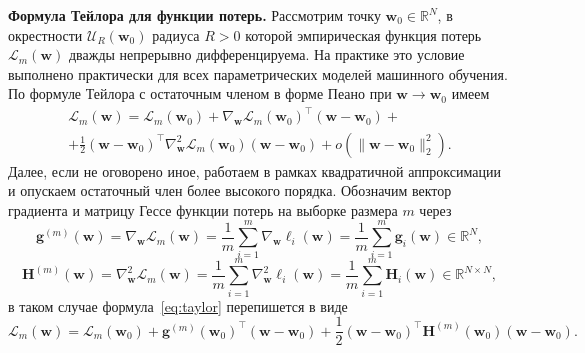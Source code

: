 \textbf{Формула Тейлора для функции потерь.} Рассмотрим точку $\mathbf{w}_0 \in \mathbb{R}^{N}$, в окрестности $\mathcal{U}_{R}(\mathbf{w}_0)$ радиуса $R>0$ которой эмпирическая функция потерь $\mathcal{L}_{m}(\mathbf{w})$ дважды непрерывно дифференцируема. На практике это условие выполнено практически для всех параметрических моделей машинного обучения. По формуле Тейлора с остаточным членом в форме Пеано при $\mathbf{w} \to \mathbf{w}_0$ имеем
\begin{multline}
    \label{eq:taylor}
    \mathcal{L}_{m}(\mathbf{w}) = \mathcal{L}_{m}(\mathbf{w}_0)
    +
    \nabla_{\mathbf{w}} \mathcal{L}_{m}(\mathbf{w}_0)^{\top} (\mathbf{w} - \mathbf{w}_0)
    +
    \\
    +
    \frac{1}{2} (\mathbf{w} - \mathbf{w}_0)^{\top} \nabla^{2}_{\mathbf{w}} \mathcal{L}_{m}(\mathbf{w}_0) (\mathbf{w} - \mathbf{w}_0)
    +
    o(\| \mathbf{w} - \mathbf{w}_0 \|_2^2).
\end{multline}
Далее, если не оговорено иное, работаем в рамках квадратичной аппроксимации и опускаем остаточный член более высокого порядка. Обозначим вектор градиента и матрицу Гессе функции потерь на выборке размера $m$ через
\begin{equation}
    \label{eq:taylor-gradient}
    \mathbf{g}^{(m)}(\mathbf{w}) = \nabla_{\mathbf{w}} \mathcal{L}_{m}(\mathbf{w}) = \frac{1}{m}\sum_{i=1}^m \nabla_{\mathbf{w}} \ell_{i}(\mathbf{w}) = \frac{1}{m}\sum_{i=1}^m \mathbf{g}_i(\mathbf{w}) \in \mathbb{R}^{N},
\end{equation}
\begin{equation}
    \label{eq:taylor-hessian}
    \mathbf{H}^{(m)}(\mathbf{w}) = \nabla^{2}_{\mathbf{w}} \mathcal{L}_{m}(\mathbf{w}) = \frac{1}{m}\sum_{i=1}^m \nabla_{\mathbf{w}}^2 \ell_{i}(\mathbf{w}) = \frac{1}{m}\sum_{i=1}^m \mathbf{H}_i(\mathbf{w}) \in \mathbb{R}^{N \times N},
\end{equation}
в таком случае формула~\eqref{eq:taylor} перепишется в виде
\begin{equation}
    \label{eq:taylor-second-order}
    \mathcal{L}_{m}(\mathbf{w}) = \mathcal{L}_{m}(\mathbf{w}_0)
    +
    \mathbf{g}^{(m)}(\mathbf{w}_0)^{\top} (\mathbf{w} - \mathbf{w}_0)
    +
    \frac{1}{2} (\mathbf{w} - \mathbf{w}_0)^{\top} \mathbf{H}^{(m)}(\mathbf{w}_0) (\mathbf{w} - \mathbf{w}_0).
\end{equation}

